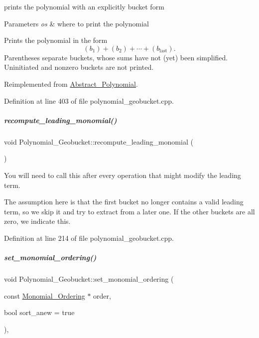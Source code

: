 prints the polynomial with an explicitly bucket form 


\begin{DoxyParams}{Parameters}
{\em os} & where to print the polynomial\\
\hline
\end{DoxyParams}
Prints the polynomial in the form \[(b_1) + (b_2) + \cdots + (b_\textrm{last}).\] Parentheses separate buckets, whose sums have not (yet) been simplified. Uninitiated and nonzero buckets are not printed. 

Reimplemented from \hyperlink{group__polygroup_adbbb6af1fb79d5794af42e28d584641b}{Abstract\+\_\+\+Polynomial}.



Definition at line 403 of file polynomial\+\_\+geobucket.\+cpp.

\mbox{\label{group__polygroup_ab57dbe8d5f0d3860997775d9f354ab0c}} 
\subparagraph{\texorpdfstring{recompute\+\_\+leading\+\_\+monomial()}{recompute\_leading\_monomial()}}
{\footnotesize\ttfamily void Polynomial\+\_\+\+Geobucket\+::recompute\+\_\+leading\+\_\+monomial (\begin{DoxyParamCaption}{ }\end{DoxyParamCaption})}



You will need to call this after every operation that might modify the leading term. 

The assumption here is that the first bucket no longer contains a valid leading term, so we skip it and try to extract from a later one. If the other buckets are all zero, we indicate this. 

Definition at line 214 of file polynomial\+\_\+geobucket.\+cpp.

\mbox{\label{group__polygroup_ad3298b3201f53d0ddaa657206c140ca8}} 
\subparagraph{\texorpdfstring{set\+\_\+monomial\+\_\+ordering()}{set\_monomial\_ordering()}}
{\footnotesize\ttfamily void Polynomial\+\_\+\+Geobucket\+::set\+\_\+monomial\+\_\+ordering (\begin{DoxyParamCaption}\item[{const \hyperlink{group__orderinggroup_class_monomial___ordering}{Monomial\+\_\+\+Ordering} $\ast$}]{order,  }\item[{bool}]{sort\+\_\+anew = {\ttfamily true} }\end{DoxyParamCaption})\hspace{0.3cm}{\ttfamily [override]}, {\ttfamily [virtual]}}



